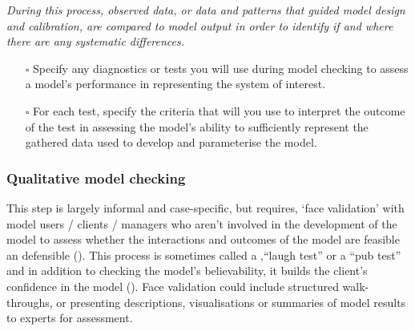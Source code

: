 \documentclass[
]{article}
\providecommand{\tightlist}{%
  \setlength{\itemsep}{0pt}\setlength{\parskip}{0pt}}\usepackage{longtable,booktabs,array}
\begin{document}
\begin{tcolorbox}[enhanced jigsaw, toprule=.15mm, titlerule=0mm, coltitle=black, title=\textcolor{quarto-callout-caution-color}{\faFire}\hspace{0.5em}{Preregistration Item}, bottomtitle=1mm, arc=.35mm, breakable, toptitle=1mm, bottomrule=.15mm, left=2mm, colframe=quarto-callout-caution-color-frame, colback=white, rightrule=.15mm, leftrule=.75mm, colbacktitle=quarto-callout-caution-color!10!white, opacityback=0, opacitybacktitle=0.6]

\emph{During this process, observed data, or data and patterns that
guided model design and calibration, are compared to model output in
order to identify if and where there are any systematic differences.}

\begin{itemize}
\tightlist
\item[$\square$]
  Specify any diagnostics or tests you will use during model checking to
  assess a model's performance in representing the system of interest.
\item[$\square$]
  For each test, specify the criteria that will you use to interpret the
  outcome of the test in assessing the model's ability to sufficiently
  represent the gathered data used to develop and parameterise the
  model.
\end{itemize}

\end{tcolorbox}

\subsubsection{Qualitative model
checking}\label{qualitative-model-checking}

\begin{tcolorbox}[enhanced jigsaw, toprule=.15mm, titlerule=0mm, coltitle=black, title=\textcolor{quarto-callout-note-color}{\faInfo}\hspace{0.5em}{Explanation}, bottomtitle=1mm, arc=.35mm, breakable, toptitle=1mm, bottomrule=.15mm, left=2mm, colframe=quarto-callout-note-color-frame, colback=white, rightrule=.15mm, leftrule=.75mm, colbacktitle=quarto-callout-note-color!10!white, opacityback=0, opacitybacktitle=0.6]

This step is largely informal and case-specific, but requires‚ `face
validation' with model users / clients / managers who aren't involved in
the development of the model to assess whether the interactions and
outcomes of the model are feasible an defensible
(). This process is
sometimes called a ‚``laugh test'' or a ``pub test'' and in addition to
checking the model's believability, it builds the client's confidence in
the model (). Face
validation could include structured walk-throughs, or presenting
descriptions, visualisations or summaries of model results to experts
for assessment.

\end{tcolorbox}
\end{document}
